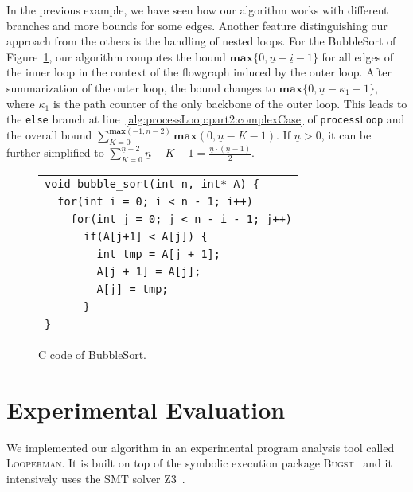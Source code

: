 \documentclass[10pt,a4paper]{article}
\newcommand{\Looperman}{\textsc{Looperman}\xspace}
\newcommand{\sym}[1]{\ensuremath{\underline{#1}}}
\newcommand{\maxim}{\ensuremath{\mathbf{max}}}
\begin{document}
In the previous example, we have seen how our algorithm works with
different branches and more bounds for some edges. Another feature
distinguishing our approach from the others is the handling of nested
loops. For the BubbleSort of Figure~\ref{fig:bubble}, our algorithm
computes the bound $\maxim\{0,\sym{n}-\sym{i}-1\}$ for all edges of
the inner loop in the context of the flowgraph induced by the outer
loop. After summarization of the outer loop, the bound changes to
$\maxim\{0,\sym{n}-\kappa_1-1\}$, where $\kappa_1$ is the path counter
of the only backbone of the outer loop. This leads to the
\texttt{else} branch at line~\ref{alg:processLoop:part2:complexCase}
of \texttt{processLoop} and the overall bound
$\sum_{K = 0}^{\maxim(-1,\sym{n}-2)} \maxim(0,\sym{n}-K-1)$. If
$\sym{n}>0$, it can be further simplified to
$\sum_{K = 0}^{\sym{n}-2} \sym{n}-K-1=\frac{\sym{n}\cdot(\sym{n}-1)}{2}$.

\begin{figure}[t] \begin{center}
\begin{tabular}{l}
\texttt{void bubble\_sort(int n, int* A) \{}\\
\texttt{~~for(int i = 0; i < n - 1; i++)}\\
\texttt{~~~~for(int j = 0; j < n - i - 1; j++)}\\
\texttt{~~~~~~if(A[j+1] < A[j]) \{}\\
\texttt{~~~~~~~~int tmp = A[j + 1];}\\
\texttt{~~~~~~~~A[j + 1] = A[j];}\\
\texttt{~~~~~~~~A[j] = tmp;}\\
\texttt{~~~~~~\}}\\
\texttt{\}}\\
\end{tabular}
\end{center}
\caption{C code of BubbleSort.}
\label{fig:bubble}
\end{figure}




\section{Experimental Evaluation}\label{sec:eval}

We implemented our algorithm in an experimental program analysis tool called
\Looperman. It is built on top of the symbolic execution package
\textsc{Bugst}~\cite{BugstURL} and it intensively uses the SMT solver
\textsc{Z3}~\cite{Z3URL}.
\end{document}
